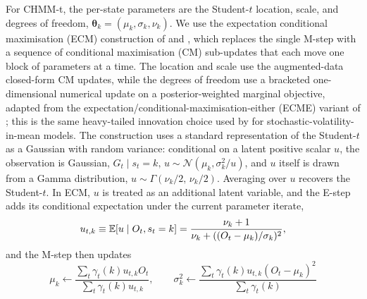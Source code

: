 For CHMM-t, the per-state parameters are the Student-$t$ location, scale, and degrees of freedom, $\boldsymbol\theta_k = (\mu_k, \sigma_k, \nu_k)$. We use the expectation conditional maximisation (ECM) construction of \citet{peel2000robust} and \citet{liu1995ml}, which replaces the single M-step with a sequence of conditional maximisation (CM) sub-updates that each move one block of parameters at a time. The location and scale use the augmented-data closed-form CM updates, while the degrees of freedom use a bracketed one-dimensional numerical update on a posterior-weighted marginal objective, adapted from the expectation/conditional-maximisation-either (ECME) variant of \citet{liu1995ml}; this is the same heavy-tailed innovation choice used by \citet{abantovalle2017svm} for stochastic-volatility-in-mean models. The construction uses a standard representation of the Student-$t$ as a Gaussian with random variance: conditional on a latent positive scalar $u$, the observation is Gaussian, $G_t \mid s_t = k,\, u \sim \mathcal{N}(\mu_k, \sigma_k^2/u)$, and $u$ itself is drawn from a Gamma distribution, $u \sim \Gamma(\nu_k/2,\, \nu_k/2)$. Averaging over $u$ recovers the Student-$t$. In ECM, $u$ is treated as an additional latent variable, and the E-step adds its conditional expectation under the current parameter iterate,
\begin{equation}
    u_{t,k} \equiv \mathbb{E}[u \mid O_t, s_t = k] = \frac{\nu_k + 1}{\nu_k + ((O_t - \mu_k)/\sigma_k)^2},
    \label{eq:tprecision}
\end{equation}
and the M-step then updates
\begin{equation}
    \mu_k \leftarrow \frac{\sum_t \gamma_t(k) u_{t,k} O_t}{\sum_t \gamma_t(k) u_{t,k}},
    \qquad
    \sigma_k^2 \leftarrow \frac{\sum_t \gamma_t(k) u_{t,k} (O_t - \mu_k)^2}{\sum_t \gamma_t(k)}
    \label{eq:tupdate}
\end{equation}
